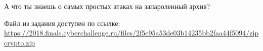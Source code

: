
А что ты знаешь о самых простых атаках на запароленный архив?

Файл из задания доступен по ссылке: \url{https://2018.finals.cyberchallenge.ru/files/2f5e95a53de03b14235bb2faa44f5094/zipcrypto.zip}
 
